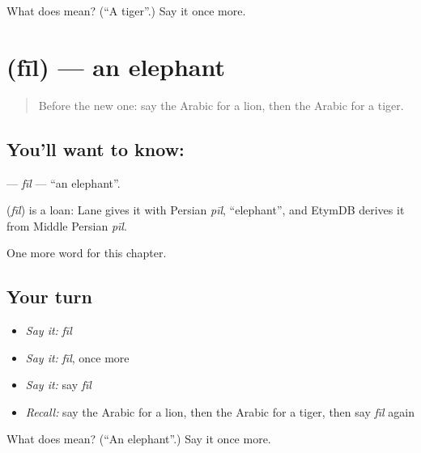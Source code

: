 \begin{tcolorbox}[breakable,colback=teal!4,colframe=teal!35!black,title={Before you move on}]
What does  mean? (\textquotedblleft{}A tiger\textquotedblright{}.) Say it once more.
\end{tcolorbox}
\section[\texorpdfstring{\ar{فيل} (fīl)}{فيل (fīl)}]{ (fīl) — an elephant}

\label{lesson:AR-C80-fil}



\begin{quote}
Before the new one: say the Arabic for a lion, then the Arabic for a tiger.
\end{quote}

\subsection*{You'll want to know: }
\textbf{} — \emph{fīl} — \textquotedblleft{}an elephant\textquotedblright{}.

\begin{cousinweb}
\textbf{} (\emph{fīl}) is a loan: Lane gives it with Persian \emph{pīl}, \textquotedblleft{}elephant\textquotedblright{}, and EtymDB derives it from Middle Persian \emph{pīl}.
\end{cousinweb}

\begin{grammarlens}[title={What you've built}]
One more word for this chapter.
\end{grammarlens}

\subsection*{Your turn}
\begin{itemize}
\raggedright
  \item \emph{Say it:} \emph{fīl}
  \item \emph{Say it:} \emph{fīl}, once more
  \item \emph{Say it:} say \emph{fīl}
  \item \emph{Recall:} say the Arabic for a lion, then the Arabic for a tiger, then say \emph{fīl} again
\end{itemize}

\begin{tcolorbox}[breakable,colback=teal!4,colframe=teal!35!black,title={Before you move on}]
What does  mean? (\textquotedblleft{}An elephant\textquotedblright{}.) Say it once more.
\end{tcolorbox}

